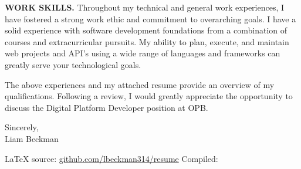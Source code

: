 \vspace*{\baselineskip}

\textbf{WORK SKILLS.} Throughout my technical and general work experiences, I have fostered a strong work ethic and commitment to overarching goals. I have a solid experience with software development foundations from a combination of courses and extracurricular pursuits. My ability to plan, execute, and maintain web projects and API's using a wide range of languages and frameworks can greatly serve your technological goals.

\vspace*{\baselineskip}

The above experiences and my attached resume provide an overview of my qualifications. Following a review, I would greatly appreciate the opportunity to discuss the Digital Platform Developer position at OPB.

\vspace*{2\baselineskip}

Sincerely,\\

Liam Beckman


\vfill \myBreak{}
\textcolor{my-red}{\LaTeX{} source:} \textcolor{my-blue}{\href{https://github.com/lbeckman314/resume}{github.com/lbeckman314/resume}}
\hfill
\textcolor{my-red}{Compiled:} \textcolor{my-blue}{\href{https://liambeckman.com/jenkins/job/resume/}{\DTMtoday}}

